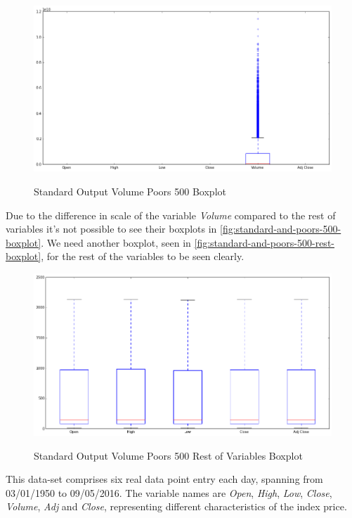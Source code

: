 \begin{figure}[bth]
  \myfloatalign
  {\includegraphics[width=1\linewidth]
    {gfx/standard-and-poors-500-boxplot}}
  \caption{Standard Output Volume Poors 500
    Boxplot}
  \label{fig:standard-and-poors-500-boxplot}
\end{figure}

Due to the difference in scale of the variable \textit{Volume}
compared to the rest of variables it's not possible to see their
boxplots in \autoref{fig:standard-and-poors-500-boxplot}. We need
another boxplot, seen in
\autoref{fig:standard-and-poors-500-rest-boxplot}, for the rest of the
variables to be seen clearly.

\begin{figure}[bth]
  \myfloatalign
  {\includegraphics[width=1\linewidth]
    {gfx/standard-and-poors-500-rest-boxplot}}
  \caption{Standard Output Volume Poors 500
    Rest of Variables Boxplot}
  \label{fig:standard-and-poors-500-rest-boxplot}
\end{figure}

This data-set comprises six real data point entry each day, spanning
from 03/01/1950 to 09/05/2016. The variable names are \textit{Open},
\textit{High}, \textit{Low}, \textit{Close}, \textit{Volume},
\textit{Adj} and \textit{Close}, representing different
characteristics of the index price.


